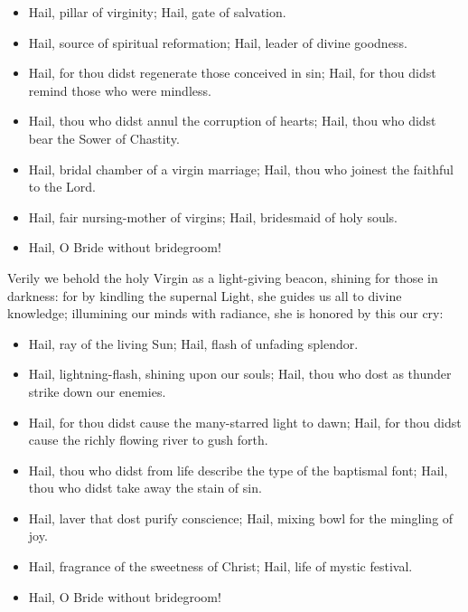 \documentclass[twoside, letterpaper, 12pt]{report}
\begin{document}
\begin{itemize}[label=\tiny{+},leftmargin=*]
\item Hail, pillar of virginity;
      Hail, gate of salvation.
\item Hail, source of spiritual reformation;
      Hail, leader of divine goodness.
\item Hail, for thou didst regenerate those conceived in sin;
      Hail, for thou didst remind those who were mindless.
\item Hail, thou who didst annul the corruption of hearts;
      Hail, thou who didst bear the Sower of Chastity.
\item Hail, bridal chamber of a virgin marriage;
      Hail, thou who joinest the faithful to the Lord.
\item Hail, fair nursing-mother of virgins;
      Hail, bridesmaid of holy souls. 
\item Hail, O Bride without bridegroom!
\end{itemize}





\begin{reader}
  \item Verily we behold the holy Virgin as a light-giving beacon, shining for those in
  darkness: for by kindling the supernal Light, she guides us all to divine knowledge;
  illumining our minds with radiance, she is honored by this our cry:
\end{reader}

\begin{itemize}[label=\tiny{+},leftmargin=*]
\item Hail, ray of the living Sun;
      Hail, flash of unfading splendor.
\item Hail, lightning-flash, shining upon our souls;
      Hail, thou who dost as thunder strike down our enemies.
\item Hail, for thou didst cause the many-starred light to dawn;
      Hail, for thou didst cause the richly flowing river to gush forth.
\item Hail, thou who didst from life describe the type of the baptismal font;
      Hail, thou who didst take away the stain of sin.
\item Hail, laver that dost purify conscience;
      Hail, mixing bowl for the mingling of joy.
\item Hail, fragrance of the sweetness of Christ;
      Hail, life of mystic festival. 
\item Hail, O Bride without bridegroom!
\end{itemize}
\end{document}
